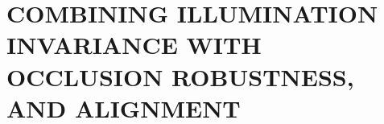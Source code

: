 
\chapter{COMBINING ILLUMINATION INVARIANCE WITH OCCLUSION ROBUSTNESS, AND ALIGNMENT}
\label{chap:cvpr}






%


%




